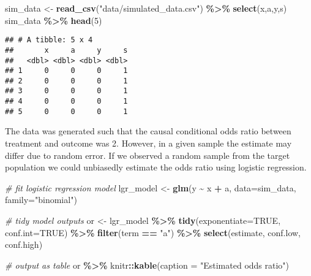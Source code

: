 \documentclass[
]{book}
\newenvironment{Shaded}{\begin{snugshade}}{\end{snugshade}}
\newcommand{\AttributeTok}[1]{\textcolor[rgb]{0.13,0.29,0.53}{#1}}
\newcommand{\CommentTok}[1]{\textcolor[rgb]{0.56,0.35,0.01}{\textit{#1}}}
\newcommand{\ConstantTok}[1]{\textcolor[rgb]{0.56,0.35,0.01}{#1}}
\newcommand{\DecValTok}[1]{\textcolor[rgb]{0.00,0.00,0.81}{#1}}
\newcommand{\FunctionTok}[1]{\textcolor[rgb]{0.13,0.29,0.53}{\textbf{#1}}}
\newcommand{\NormalTok}[1]{#1}
\newcommand{\OtherTok}[1]{\textcolor[rgb]{0.56,0.35,0.01}{#1}}
\newcommand{\SpecialCharTok}[1]{\textcolor[rgb]{0.81,0.36,0.00}{\textbf{#1}}}
\newcommand{\StringTok}[1]{\textcolor[rgb]{0.31,0.60,0.02}{#1}}
\begin{document}
\begin{Shaded}
\begin{Highlighting}[]
\NormalTok{sim\_data }\OtherTok{\textless{}{-}} \FunctionTok{read\_csv}\NormalTok{(}\StringTok{"data/simulated\_data.csv"}\NormalTok{) }\SpecialCharTok{\%\textgreater{}\%} \FunctionTok{select}\NormalTok{(x,a,y,s)}
\NormalTok{sim\_data  }\SpecialCharTok{\%\textgreater{}\%} \FunctionTok{head}\NormalTok{(}\DecValTok{5}\NormalTok{)}
\end{Highlighting}
\end{Shaded}

\begin{verbatim}
## # A tibble: 5 x 4
##       x     a     y     s
##   <dbl> <dbl> <dbl> <dbl>
## 1     0     0     0     1
## 2     0     0     0     1
## 3     0     0     0     1
## 4     0     0     0     1
## 5     0     0     0     1
\end{verbatim}

The data was generated such that the causal conditional odds ratio between treatment and outcome was 2. However, in a given sample the estimate may differ due to random error. If we observed a random sample from the target population we could unbiasedly estimate the odds ratio using logistic regression.

\begin{Shaded}
\begin{Highlighting}[]
\CommentTok{\# fit logistic regression model}
\NormalTok{lgr\_model }\OtherTok{\textless{}{-}} \FunctionTok{glm}\NormalTok{(y }\SpecialCharTok{\textasciitilde{}}\NormalTok{ x }\SpecialCharTok{+}\NormalTok{ a, }\AttributeTok{data=}\NormalTok{sim\_data, }\AttributeTok{family=}\StringTok{"binomial"}\NormalTok{) }

\CommentTok{\# tidy model outputs}
\NormalTok{or }\OtherTok{\textless{}{-}}\NormalTok{ lgr\_model }\SpecialCharTok{\%\textgreater{}\%} 
  \FunctionTok{tidy}\NormalTok{(}\AttributeTok{exponentiate=}\ConstantTok{TRUE}\NormalTok{, }\AttributeTok{conf.int=}\ConstantTok{TRUE}\NormalTok{) }\SpecialCharTok{\%\textgreater{}\%} 
  \FunctionTok{filter}\NormalTok{(term }\SpecialCharTok{==} \StringTok{"a"}\NormalTok{) }\SpecialCharTok{\%\textgreater{}\%} 
  \FunctionTok{select}\NormalTok{(estimate, conf.low, conf.high)}

\CommentTok{\# output as table}
\NormalTok{or }\SpecialCharTok{\%\textgreater{}\%} 
\NormalTok{  knitr}\SpecialCharTok{::}\FunctionTok{kable}\NormalTok{(}\AttributeTok{caption =} \StringTok{"Estimated odds ratio"}\NormalTok{)}
\end{Highlighting}
\end{Shaded}
\end{document}
